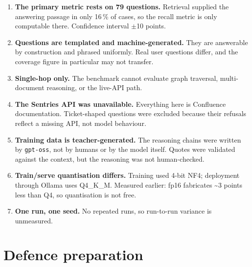 \documentclass[11pt,a4paper]{article}
\begin{document}
\begin{enumerate}[leftmargin=1.4em,itemsep=3pt]
  \item \textbf{The primary metric rests on 79 questions.} Retrieval supplied the
        answering passage in only 16\,\% of cases, so the recall metric is only
        computable there. Confidence interval $\pm$10 points.
  \item \textbf{Questions are templated and machine-generated.} They are answerable
        by construction and phrased uniformly. Real user questions differ, and the
        coverage figure in particular may not transfer.
  \item \textbf{Single-hop only.} The benchmark cannot evaluate graph traversal,
        multi-document reasoning, or the live-API path.
  \item \textbf{The Sentries API was unavailable.} Everything here is Confluence
        documentation. Ticket-shaped questions were excluded because their
        refusals reflect a missing API, not model behaviour.
  \item \textbf{Training data is teacher-generated.} The reasoning chains were
        written by \texttt{gpt-oss}, not by humans or by the model itself. Quotes
        were validated against the context, but the reasoning was not human-checked.
  \item \textbf{Train/serve quantisation differs.} Training used 4-bit NF4;
        deployment through Ollama uses Q4\_K\_M. Measured earlier: fp16 fabricates
        \textasciitilde3 points less than Q4, so quantisation is not free.
  \item \textbf{One run, one seed.} No repeated runs, so run-to-run variance is
        unmeasured.
\end{enumerate}

\section{Defence preparation}
\end{document}
